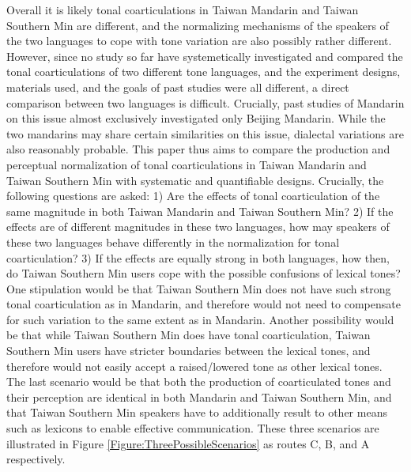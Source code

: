 Overall it is likely tonal coarticulations in Taiwan Mandarin and Taiwan Southern Min are different, and the normalizing mechanisms of the speakers of the two languages to cope with tone variation are also possibly rather different. However, since no study so far have systemetically investigated and compared the tonal coarticulations of two different tone languages, and the experiment designs, materials used, and the goals of past studies were all different, a direct comparison between two languages is difficult. Crucially, past studies of Mandarin on this issue almost exclusively investigated only Beijing Mandarin. While the two mandarins may share certain similarities on this issue, dialectal variations are also reasonably probable. This paper thus aims to compare the production and perceptual normalization of tonal coarticulations in Taiwan Mandarin and Taiwan Southern Min with systematic and quantifiable designs. Crucially, the following questions are asked: 1) Are the effects of tonal coarticulation of the same magnitude in both Taiwan Mandarin and Taiwan Southern Min? 2) If the effects are of different magnitudes in these two languages, how may speakers of these two languages behave differently in the normalization for tonal coarticulation? 3) If the effects are equally strong in both languages, how then, do Taiwan Southern Min users cope with the possible confusions of lexical tones? One stipulation would be that Taiwan Southern Min does not have such strong tonal coarticulation as in Mandarin, and therefore would not need to compensate for such variation to the same extent as in Mandarin. Another possibility would be that while Taiwan Southern Min does have tonal coarticulation, Taiwan Southern Min users have stricter boundaries between the lexical tones, and therefore would not easily accept a raised/lowered tone as other lexical tones. The last scenario would be that both the production of coarticulated tones and their perception are identical in both Mandarin and Taiwan Southern Min, and that Taiwan Southern Min speakers have to additionally result to other means such as lexicons to enable effective communication. These three scenarios are illustrated in Figure \ref{Figure:ThreePossibleScenarios} as routes C, B, and A respectively.

